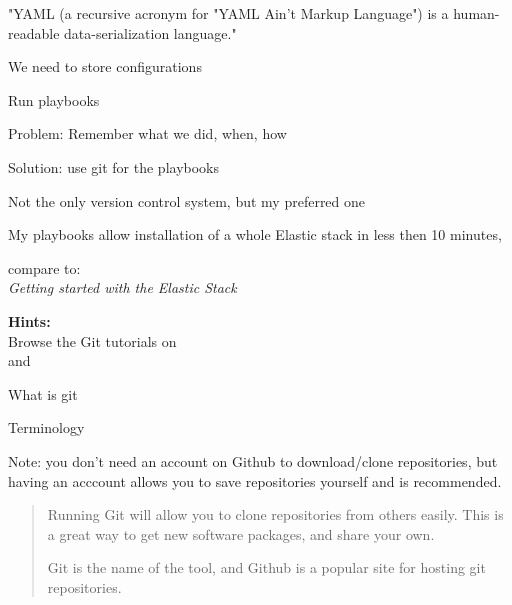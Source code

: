 \documentclass[Screen16to9,17pt]{foils}
\begin{document}
"YAML (a recursive acronym for "YAML Ain't Markup Language") is a human-readable data-serialization language."\\



\begin{list2}
\item We need to store configurations
\item Run playbooks
\item Problem: Remember what we did, when, how
\item Solution: use git for the playbooks
\item Not the only version control system, but my preferred one
\end{list2}



My playbooks allow installation of a whole Elastic stack in less then 10 minutes,

compare to:\\
\emph{Getting started with the Elastic Stack}\\
{\footnotesize{}}



{\bf Hints:}\\
Browse the Git tutorials on \\
and 

\begin{list2}
\item What is git
\item Terminology
\end{list2}

Note: you don't need an account on Github to download/clone repositories, but having an acccount allows you to save repositories yourself and is recommended.


\begin{quote}
  Running Git will allow you to clone repositories from others easily. This is a great way to get new software packages, and share your own.

  Git is the name of the tool, and Github is a popular site for hosting git repositories.
\end{quote}
\end{document}
